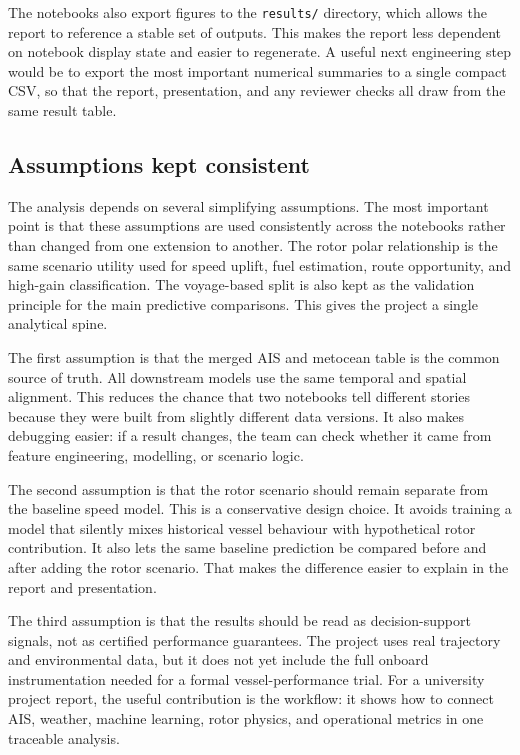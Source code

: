 \documentclass[10pt,a4paper]{article}
\begin{document}
The notebooks also export figures to the \texttt{results/} directory, which
allows the report to reference a stable set of outputs. This makes the report
less dependent on notebook display state and easier to regenerate. A useful next
engineering step would be to export the most important numerical summaries to a
single compact CSV, so that the report, presentation, and any reviewer checks
all draw from the same result table.

\subsection{Assumptions kept consistent}

The analysis depends on several simplifying assumptions. The most important
point is that these assumptions are used consistently across the notebooks
rather than changed from one extension to another. The rotor polar relationship
is the same scenario utility used for speed uplift, fuel estimation, route
opportunity, and high-gain classification. The voyage-based split is also kept
as the validation principle for the main predictive comparisons. This gives the
project a single analytical spine.

The first assumption is that the merged AIS and metocean table is the common
source of truth. All downstream models use the same temporal and spatial
alignment. This reduces the chance that two notebooks tell different stories
because they were built from slightly different data versions. It also makes
debugging easier: if a result changes, the team can check whether it came from
feature engineering, modelling, or scenario logic.

The second assumption is that the rotor scenario should remain separate from the
baseline speed model. This is a conservative design choice. It avoids training a
model that silently mixes historical vessel behaviour with hypothetical rotor
contribution. It also lets the same baseline prediction be compared before and
after adding the rotor scenario. That makes the difference easier to explain in
the report and presentation.

The third assumption is that the results should be read as decision-support
signals, not as certified performance guarantees. The project uses real
trajectory and environmental data, but it does not yet include the full onboard
instrumentation needed for a formal vessel-performance trial. For a university
project report, the useful contribution is the workflow: it shows how to
connect AIS, weather, machine learning, rotor physics, and operational metrics
in one traceable analysis.
\end{document}
